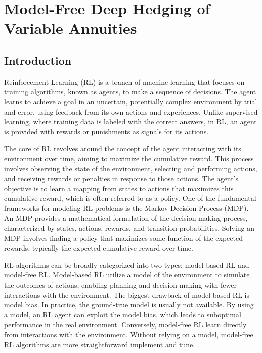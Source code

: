 \chapter{Model-Free Deep Hedging of Variable Annuities}

\section{Introduction}

Reinforcement Learning (RL) is a branch of machine learning that focuses on training algorithms, known as agents, to make a sequence of decisions. 
The agent learns to achieve a goal in an uncertain, potentially complex environment by trial and error, using feedback from its own actions and experiences. 
Unlike supervised learning, where training data is labeled with the correct answers, in RL, an agent is provided with rewards or punishments as signals for its actions.

The core of RL revolves around the concept of the agent interacting with its environment over time, aiming to maximize the cumulative reward. 
This process involves observing the state of the environment, selecting and performing actions, and receiving rewards or penalties in response to those actions. 
The agent's objective is to learn a mapping from states to actions that maximizes this cumulative reward, which is often referred to as a policy. 
One of the fundamental frameworks for modeling RL problems is the Markov Decision Process (MDP). 
An MDP provides a mathematical formulation of the decision-making process, characterized by states, actions, rewards, and transition probabilities. 
Solving an MDP involves finding a policy that maximizes some function of the expected rewards, typically the expected cumulative reward over time.

RL algorithms can be broadly categorized into two types: model-based RL and model-free RL. 
Model-based RL utilize a model of the environment to simulate the outcomes of actions, enabling planning and decision-making with fewer interactions with the environment. 
The biggest drawback of model-based RL is model bias. 
In practice, the ground-true model is usually not available.
By using a model, an RL agent can exploit the model bias, which leads to suboptimal performance in the real environment.
Conversely, model-free RL learn directly from interactions with the environment.
Without relying on a model, model-free RL algorithms are more straightforward implement and tune.

